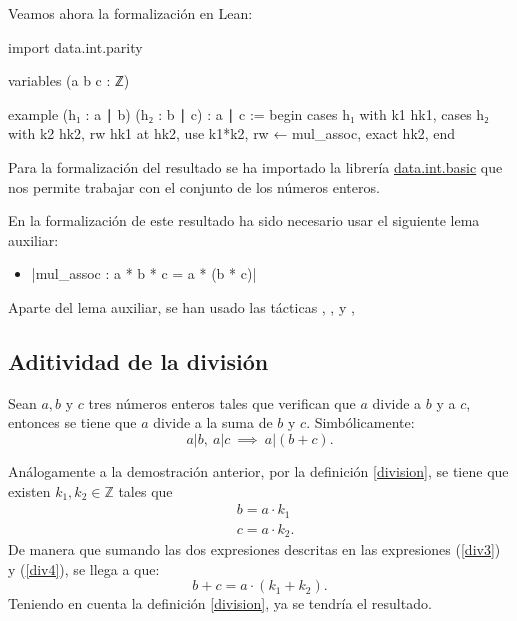 Veamos ahora la formalización en Lean:
\begin{leancode}
import data.int.parity

variables (a b c : ℤ)

example (h₁ : a ∣ b) (h₂ : b ∣ c) : a ∣ c :=
begin
  cases h₁ with k1 hk1,
  cases h₂ with k2 hk2,
  rw hk1 at hk2,
  use k1*k2,
  rw ← mul_assoc,
exact hk2,
end
\end{leancode}

Para la formalización del resultado se ha importado la librería
\href{https://github.com/leanprover-community/mathlib/blob/master/src/data/int/basic.lean}{data.int.basic}
que nos permite trabajar con el conjunto de los números enteros.

En la formalización de este resultado ha sido necesario usar el siguiente
lema auxiliar:
\begin{itemize}
\item {}|mul_assoc : a * b * c = a * (b * c)|
\end{itemize}

Aparte del lema auxiliar, se han usado las tácticas
,
,
 y
,

\subsection{Aditividad de la división}

\begin{teorema}
  Sean \(a, b\) y \(c\) tres números enteros tales que verifican que
  \(a\) divide a \(b\) y a \(c\), entonces se tiene que \(a\) divide a
  la suma de \(b\) y \(c\).  Simbólicamente:
  \begin{equation}
  a|b, \ a|c \ ⟹ \ a|(b+c).
  \end{equation}
\end{teorema}

\begin{demostracion}
  Análogamente a la demostración anterior, por la definición
  \ref{division}, se tiene que existen \(k_1, k_2 ∈ ℤ\) tales que
  \begin{align}
    & b = a · k_1 \label{div3} \\
    & c = a · k_2 . \label{div4}
  \end{align}
  De manera que sumando las dos expresiones descritas en las expresiones
  (\ref{div3}) y (\ref{div4}), se llega a que:
  \begin{equation*}
    b+c = a· (k_1+k_2).
  \end{equation*}
  Teniendo en cuenta la definición \ref{division}, ya se tendría
  el resultado.
\end{demostracion}

